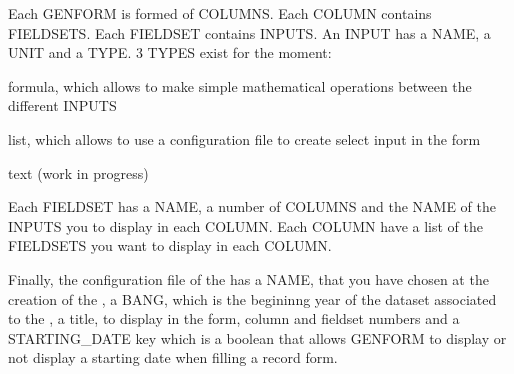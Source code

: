 Each GENFORM is formed of COLUMNS. Each COLUMN contains FIELDSETS. Each FIELDSET contains INPUTS. An INPUT has a NAME, a UNIT and a TYPE. 3 TYPES exist for the moment:

\begin{list}
	\item formula, which allows to make simple mathematical operations between the different INPUTS
	\item list, which allows to use a configuration file to create select input in the form
	\item text (work in progress)
\end{list}

Each FIELDSET has a NAME, a number of COLUMNS and the NAME of the INPUTS you to display in each COLUMN. Each COLUMN have a list of the FIELDSETS you want to display in each COLUMN.

Finally, the configuration file of the  has a NAME, that you have chosen at the creation of the , a BANG, which is the begininng year of the dataset associated to the , a title, to display in the  form, column and fieldset numbers and a STARTING_DATE key which is a boolean that allows GENFORM to display or not display a starting date when filling a record form.

